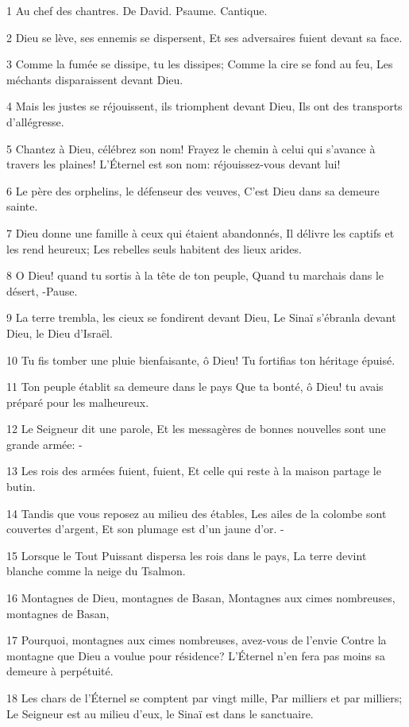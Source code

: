 \par 1 Au chef des chantres. De David. Psaume. Cantique.
\par 2 Dieu se lève, ses ennemis se dispersent, Et ses adversaires fuient devant sa face.
\par 3 Comme la fumée se dissipe, tu les dissipes; Comme la cire se fond au feu, Les méchants disparaissent devant Dieu.
\par 4 Mais les justes se réjouissent, ils triomphent devant Dieu, Ils ont des transports d'allégresse.
\par 5 Chantez à Dieu, célébrez son nom! Frayez le chemin à celui qui s'avance à travers les plaines! L'Éternel est son nom: réjouissez-vous devant lui!
\par 6 Le père des orphelins, le défenseur des veuves, C'est Dieu dans sa demeure sainte.
\par 7 Dieu donne une famille à ceux qui étaient abandonnés, Il délivre les captifs et les rend heureux; Les rebelles seuls habitent des lieux arides.
\par 8 O Dieu! quand tu sortis à la tête de ton peuple, Quand tu marchais dans le désert, -Pause.
\par 9 La terre trembla, les cieux se fondirent devant Dieu, Le Sinaï s'ébranla devant Dieu, le Dieu d'Israël.
\par 10 Tu fis tomber une pluie bienfaisante, ô Dieu! Tu fortifias ton héritage épuisé.
\par 11 Ton peuple établit sa demeure dans le pays Que ta bonté, ô Dieu! tu avais préparé pour les malheureux.
\par 12 Le Seigneur dit une parole, Et les messagères de bonnes nouvelles sont une grande armée: -
\par 13 Les rois des armées fuient, fuient, Et celle qui reste à la maison partage le butin.
\par 14 Tandis que vous reposez au milieu des étables, Les ailes de la colombe sont couvertes d'argent, Et son plumage est d'un jaune d'or. -
\par 15 Lorsque le Tout Puissant dispersa les rois dans le pays, La terre devint blanche comme la neige du Tsalmon.
\par 16 Montagnes de Dieu, montagnes de Basan, Montagnes aux cimes nombreuses, montagnes de Basan,
\par 17 Pourquoi, montagnes aux cimes nombreuses, avez-vous de l'envie Contre la montagne que Dieu a voulue pour résidence? L'Éternel n'en fera pas moins sa demeure à perpétuité.
\par 18 Les chars de l'Éternel se comptent par vingt mille, Par milliers et par milliers; Le Seigneur est au milieu d'eux, le Sinaï est dans le sanctuaire.
